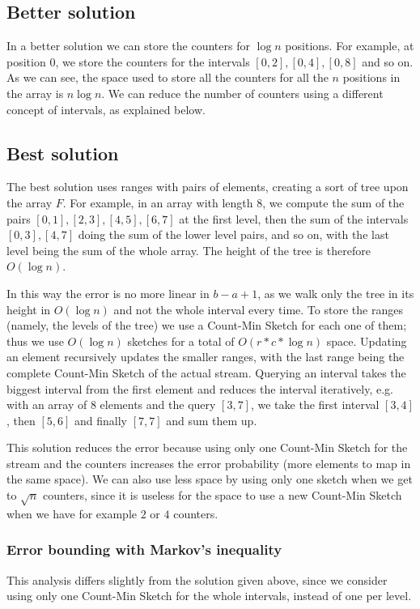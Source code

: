 \documentclass{article}
\begin{document}
\subsection{Better solution}
In a better solution we can store the counters for $\log n$ positions. For example, at position $0$, we store the counters for the intervals $[0,2],[0,4],[0,8]$ and so on. As we can see, the space used to store all the counters for all the $n$ positions in the array is $n\log n$. We can reduce the number of counters using a different concept of intervals, as explained below.

\subsection{Best solution}
The best solution uses ranges with pairs of elements, creating a sort of tree upon the array $F$. For example, in an array with length $8$, we compute the sum of the pairs $[0,1],[2,3],[4,5],[6,7]$ at the first level, then the sum of the intervals $[0,3],[4,7]$ doing the sum of the lower level pairs, and so on, with the last level being the sum of the whole array. The height of the tree is therefore $O(\log n)$.

In this way the error is no more linear in $b-a+1$, as we walk only the tree in its height in $O(\log n)$ and not the whole interval every time. To store the ranges (namely, the levels of the tree) we use a Count-Min Sketch for each one of them; thus we use $O(\log n)$ sketches for a total of $O(r * c * \log n)$ space. Updating an element recursively updates the smaller ranges, with the last range being the complete Count-Min Sketch of the actual stream. Querying an interval takes the biggest interval from the first element and reduces the interval iteratively, e.g. with an array of $8$ elements and the query $[3,7]$, we take the first interval $[3,4]$, then $[5,6]$ and finally $[7,7]$ and sum them up.

This solution reduces the error because using only one Count-Min Sketch for the stream and the counters increases the error probability (more elements to map in the same space). We can also use less space by using only one sketch when we get to $\sqrt n$ counters, since it is useless for the space to use a new Count-Min Sketch when we have for example $2$ or $4$ counters.

\subsubsection{Error bounding with Markov's inequality}
This analysis differs slightly from the solution given above, since we consider using only one Count-Min Sketch for the whole intervals, instead of one per level.
\end{document}
